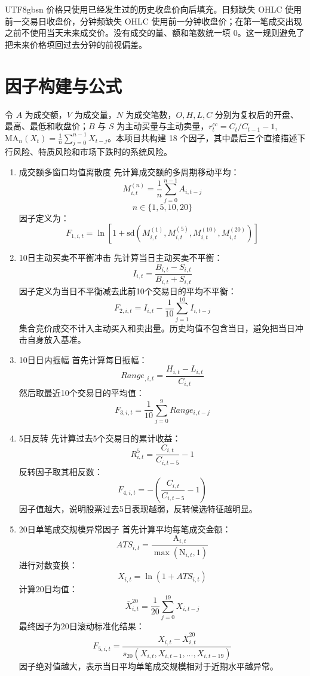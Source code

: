 \documentclass[a4paper,11pt,openany]{report}
\begin{document}
\begin{CJK*}{UTF8}{gbsn}
价格只使用已经发生过的历史收盘价向后填充。日频缺失 OHLC 使用前一交易日收盘价，分钟频缺失 OHLC 使用前一分钟收盘价；在第一笔成交出现之前不使用当天未来成交价。没有成交的量、额和笔数统一填 0。这一规则避免了把未来价格填回过去分钟的前视偏差。

\chapter{因子构建与公式}

令 $A$ 为成交额，$V$ 为成交量，$N$ 为成交笔数，$O,H,L,C$ 分别为复权后的开盘、最高、最低和收盘价；$B$ 与 $S$ 为主动买量与主动卖量，$r^{cc}_t=C_t/C_{t-1}-1$, $\mathrm{MA}_{n}(X_{t})=\frac{1}{n}\sum_{j=0}^{n-1}X_{t-j}$。本项目共构建 18 个因子，其中最后三个直接描述下行风险、特质风险和市场下跌时的系统风险。


\begin{enumerate}[label=\roman*)]
    \item 成交额多窗口均值离散度
    先计算成交额的多周期移动平均：
    $$ M^{(n)}_{i,t}=\frac{1}{n} \sum_{j=0}^{n-1}A_{i,t-j}$$
    $$n \in \{1,5,10,20\}$$
    因子定义为：
    $$F_{1,i,t} = \ln\left[1+\mathrm{sd}\left(M^{(1)}_{i,t}, M^{(5)}_{i,t},M^{(10)}_{i,t},M^{(20)}_{i,t}\right)\right]$$

    \item 10日主动买卖不平衡冲击
    先计算当日主动买卖不平衡：
    $$I_{i,t} = \frac{B_{i,t}-S_{i,t}}{B_{i,t}+S_{i,t}}$$
    因子定义为当日不平衡减去此前10个交易日的平均不平衡：
    $$F_{2,i,t}=I_{i,t}-\frac{1}{10}\sum_{j=1}^{10}I_{i,t-j}$$
    集合竞价成交不计入主动买入和卖出量。历史均值不包含当日，避免把当日冲击自身放入基准。

    \item 10日日内振幅
    首先计算每日振幅：
    $$Range_{,i,t}=\frac{H_{i,t}-L_{i,t}}{C_{i,t}}$$
    然后取最近10个交易日的平均值：
    $$F_{3,i,t}=\frac{1}{10}\sum_{j=0}^{9}Range_{i,t-j}$$

    \item 5日反转
    先计算过去5个交易日的累计收益：
    $$R^{5}_{i,t} = \frac{C_{i,t}}{C_{i,t-5}}-1$$
    反转因子取其相反数：
    $$F_{4,i,t}=-(\frac{C_{i,t}}{C_{i,t-5}}-1)$$
    因子值越大，说明股票过去5日表现越弱，反转候选特征越明显。

    \item 20日单笔成交规模异常因子
    首先计算平均每笔成交金额：
    $$ATS_{i,t}=\frac{\mathrm{A}_{i,t}}{\max(\mathrm{N}_{i,t},1)}$$
    进行对数变换：
    $$X_{i,t}=\ln(1+ATS_{i,t})$$
    计算20日均值：
    $$\overline{X}^{20}_{i,t}=\frac{1}{20}\sum^{19}_{j=0}X_{i,t-j}$$
    最终因子为20日滚动标准化结果：
    $$F_{5,i,t}=\frac{X_{i,t}-\overline{X}^{20}_{i,t}}{s_{20}(X_{i,t},X_{i,t-1},...,X_{i,t-19})}$$
    因子绝对值越大，表示当日平均单笔成交规模相对于近期水平越异常。


\end{enumerate}
\end{CJK*}
\end{document}
